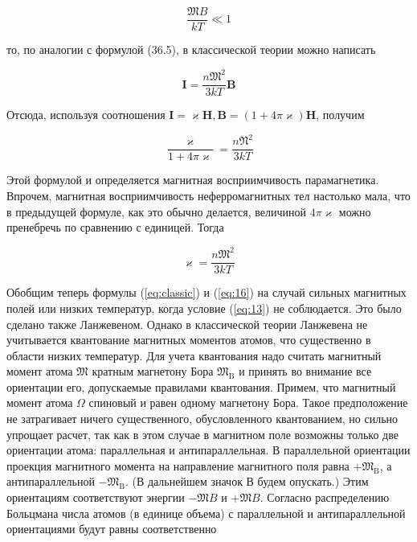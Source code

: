 \documentclass[12pt]{article}
\begin{document}
  \begin{equation}
  \label{eq:13}
  \frac{\mathfrak{M} B}{k T} \ll 1
  \end{equation}

  то, по аналогии с формулой (36.5), в классической теории можно написать

  \begin{equation}
  \label{eq:classic}
  \mathbf{I}=\frac{n \mathfrak{M}^2}{3 k T} \mathbf{B}
  \end{equation}

  Отсюда, используя соотношения $\mathbf{I}=\varkappa \mathbf{H}, \mathbf{B}=(1+4 \pi \varkappa) \mathbf{H}$, получим

  \begin{equation}
  \frac{\varkappa}{1+4 \pi \varkappa}=\frac{n \mathfrak{N}^2}{3 k T}
  \end{equation}


  Этой формулой и определяется магнитная восприимчивость парамагнетика. Впрочем, магнитная восприимчивость неферромагнитных тел настолько мала, что в предыдущей формуле, как это обычно делается, величиной $4 \pi \varkappa$ можно пренебречь по сравнению с единицей. Тогда

  \begin{equation}
  \label{eq:16}
  \varkappa=\frac{n \mathfrak{M}^2}{3 k T}
  \end{equation}

  Обобщим теперь формулы (\ref{eq:classic}) и (\ref{eq:16}) на случай сильных магнитных полей или низких температур, когда условие (\ref{eq:13}) не соблюдается. Это было сделано также Ланжевеном. Однако в классической теории Ланжевена не учитывается квантование магнитных моментов атомов, что существенно в области низких температур. Для учета квантования надо считать магнитный момент атома $\mathfrak{M}$ кратным магнетону Бора $\mathfrak{M}_{\mathrm{B}}$ и принять во внимание все ориентации его, допускаемые правилами квантования. Примем, что магнитный момент атома $\mathfrak{\Omega}$ спиновый и равен одному магнетону Бора. Такое предположение не затрагивает ничего существенного, обусловленного квантованием, но сильно упрощает расчет, так как в этом случае в магнитном поле возможны только две ориентации атома: параллельная и антипараллельная. В параллельной ориентации проекция магнитного момента на направление магнитного поля равна $+\mathfrak{M}_{\mathrm{B}}$, а антипараллельной $-\mathfrak{M}_{\mathrm{B}}$. (В дальнейшем значок В будем опускать.) Этим ориентациям соответствуют энергии $-\mathfrak{M} B$ и $+\mathfrak{M} B$. Согласно распределению Больцмана числа атомов (в единице объема) с параллельной и антипараллельной
  ориентациями будут равны соответственно
\end{document}
